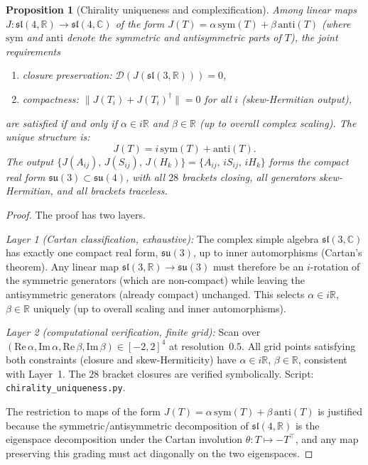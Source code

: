 \documentclass[11pt,a4paper]{article}
\theoremstyle{plain}
\newtheorem{proposition}[theorem]{Proposition}
\theoremstyle{definition}
\theoremstyle{remark}
\begin{document}
\begin{proposition}[Chirality uniqueness and complexification]\label{prop:chirality}
Among linear maps $J: \mathfrak{sl}(4,\mathbb{R}) \to \mathfrak{sl}(4,\mathbb{C})$
of the form $J(T) = \alpha\,\mathrm{sym}(T) + \beta\,\mathrm{anti}(T)$
(where $\mathrm{sym}$ and $\mathrm{anti}$ denote the symmetric and antisymmetric
parts of $T$), the joint requirements
\begin{enumerate}[label=(\roman*),noitemsep]
  \item closure preservation: $\mathcal{D}(J(\mathfrak{sl}(3,\mathbb{R}))) = 0$,
  \item compactness: $\|J(T_i) + J(T_i)^\dagger\| = 0$ for all $i$
    (skew-Hermitian output),
\end{enumerate}
are satisfied if and only if $\alpha \in i\mathbb{R}$ and $\beta \in \mathbb{R}$
(up to overall complex scaling).  The unique structure is:
\begin{equation}\label{eq:chirality-map}
  J(T) = i\,\mathrm{sym}(T) + \mathrm{anti}(T).
\end{equation}
The output $\{J(A_{ij}),\, J(S_{ij}),\, J(H_k)\}
= \{A_{ij},\, iS_{ij},\, iH_k\}$ forms the compact real form
$\mathfrak{su}(3) \subset \mathfrak{su}(4)$, with all $28$ brackets
closing, all generators skew-Hermitian, and all brackets traceless.
\end{proposition}

\begin{proof}
The proof has two layers.

\emph{Layer 1 (Cartan classification, exhaustive):}
The complex simple algebra $\mathfrak{sl}(3,\mathbb{C})$ has exactly
one compact real form, $\mathfrak{su}(3)$, up to inner automorphisms
(Cartan's theorem).  Any linear map $\mathfrak{sl}(3,\mathbb{R}) \to
\mathfrak{su}(3)$ must therefore be an $i$-rotation of the symmetric
generators (which are non-compact) while leaving the antisymmetric
generators (already compact) unchanged.  This selects
$\alpha \in i\mathbb{R}$, $\beta \in \mathbb{R}$ uniquely (up to
overall scaling and inner automorphisms).

\emph{Layer 2 (computational verification, finite grid):}
Scan over $(\mathrm{Re}\,\alpha, \mathrm{Im}\,\alpha,
\mathrm{Re}\,\beta, \mathrm{Im}\,\beta) \in [-2,2]^4$ at
resolution~$0.5$.  All grid points satisfying both constraints
(closure and skew-Hermiticity) have $\alpha \in i\mathbb{R}$,
$\beta \in \mathbb{R}$, consistent with Layer~1.
The $28$ bracket closures are verified symbolically.
Script: \texttt{chirality\_uniqueness.py}.

The restriction to maps of the form
$J(T) = \alpha\,\mathrm{sym}(T) + \beta\,\mathrm{anti}(T)$
is justified because the symmetric/antisymmetric decomposition of
$\mathfrak{sl}(4,\mathbb{R})$ is the eigenspace decomposition under
the Cartan involution $\theta: T \mapsto -T^\top$, and any map
preserving this grading must act diagonally on the two eigenspaces.
\end{proof}
\end{document}
